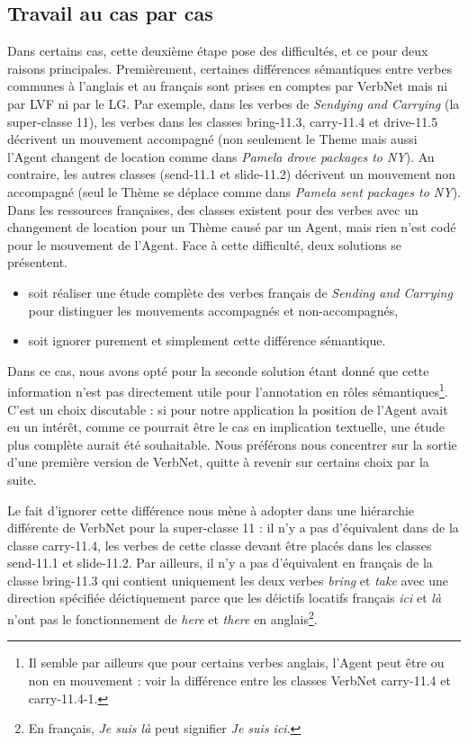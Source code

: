 \subsection{Travail au cas par cas}\label{subsubsec:casebycase}

Dans certains cas, cette deuxième étape pose des difficultés, et ce pour deux
raisons principales. Premièrement, certaines différences sémantiques entre
verbes communes à l'anglais et au français sont prises en comptes par VerbNet
mais ni par LVF ni par le LG. Par exemple, dans les verbes de \emph{Sendying
and Carrying} (la super-classe 11), les verbes dans les classes
{\color{blue}bring-11.3}, {\color{blue}carry-11.4} et {\color{blue}drive-11.5}
décrivent un mouvement accompagné (non seulement le Theme mais aussi l'Agent
changent de location comme dans \emph{Pamela drove packages to NY}). Au
contraire, les autres classes ({\color{blue}send-11.1} et
{\color{blue}slide-11.2}) décrivent un mouvement non accompagné (seul le Thème
se déplace comme dans \emph{Pamela sent packages to NY}). Dans les ressources
françaises, des classes existent pour des verbes avec un changement de location
pour un Thème causé par un Agent, mais rien n'est codé pour le mouvement de
l'Agent. Face à cette difficulté, deux solutions se présentent.

\begin{itemize}
    \item soit réaliser une étude complète des verbes français de \emph{Sending
        and Carrying} pour distinguer les mouvements accompagnés et
        non-accompagnés,
    \item soit ignorer purement et simplement cette différence sémantique.
\end{itemize}

Dans ce cas, nous avons opté pour la seconde solution étant donné que cette
information n'est pas directement utile pour l'annotation en rôles
sémantiques\footnote{Il semble par ailleurs que pour certains verbes anglais,
    l'Agent peut être ou non en mouvement : voir la différence entre les
classes VerbNet {\color{blue}carry-11.4} et {\color{blue}carry-11.4-1}.}.
C'est un choix discutable : si pour notre application la position de l'Agent
avait eu un intérêt, comme ce pourrait être le cas en implication textuelle,
une étude plus complète aurait été souhaitable. Nous préférons nous concentrer
sur la sortie d'une première version de VerbNet, quitte à revenir sur certains
choix par la suite.

Le fait d'ignorer cette différence nous mène à adopter dans \verbenet{} une
hiérarchie différente de VerbNet pour la super-classe 11 : il n'y a pas
d'équivalent dans \verbenet{} de la classe {\color{blue}carry-11.4}, les verbes
de cette classe devant être placés dans les classes {\color{blue}send-11.1} et
{\color{blue}slide-11.2}. Par ailleurs, il n'y a pas d'équivalent en français
de la classe {\color{blue}bring-11.3} qui contient uniquement les deux verbes
\emph{bring} et \emph{take} avec une direction spécifiée déictiquement
\citep[page 135]{levin1993english} parce que les déictifs locatifs français
\emph{ici} et \emph{là} n'ont pas le fonctionnement de \emph{here} et
\emph{there} en anglais\footnote{En français, \emph{Je suis là} peut signifier
\emph{Je suis ici}.}.

